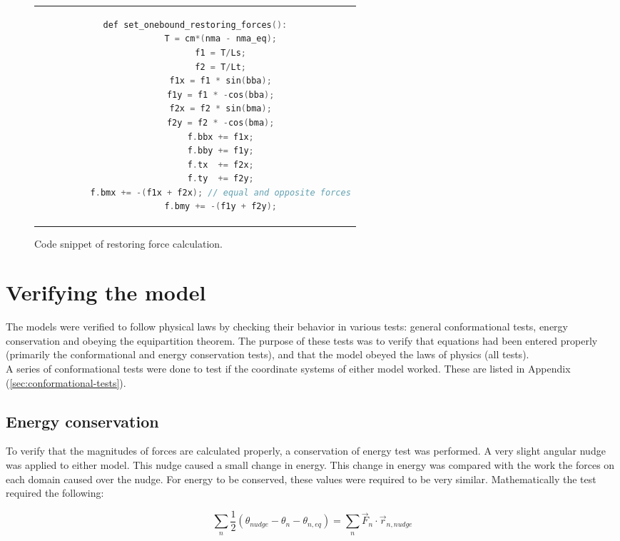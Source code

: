 \documentclass[
11pt, %
english, %
singlespacing, %
headsepline, %
chapterinoneline, %
]{MastersDoctoralThesis} %
\begin{document}
\begin{figure}[h]
  \centering
  \begin{tabular}{c}
    \begin{lstlisting}[language=C++]
      def set_onebound_restoring_forces():
          T = cm*(nma - nma_eq);
          f1 = T/Ls;
          f2 = T/Lt;
          f1x = f1 * sin(bba);
          f1y = f1 * -cos(bba);
          f2x = f2 * sin(bma);
          f2y = f2 * -cos(bma);
          f.bbx += f1x;
          f.bby += f1y;
          f.tx  += f2x;
          f.ty  += f2y;
          f.bmx += -(f1x + f2x); // equal and opposite forces
          f.bmy += -(f1y + f2y);
    \end{lstlisting}
  \end{tabular}
  \caption{Code snippet of restoring force calculation.}{}
  \label{snip:transition-rate-snippet}
\end{figure}

\section{Verifying the model}
The models were verified to follow physical laws by checking their behavior in various tests: general conformational tests, energy conservation and obeying the equipartition theorem. The purpose of these tests was to verify that equations had been entered properly (primarily the conformational and energy conservation tests), and that the model obeyed the laws of physics (all tests).\\

A series of conformational tests were done to test if the coordinate systems of either model worked. These are listed in Appendix (\ref{sec:conformational-tests}).\\

\subsection{Energy conservation}
\label{sec:energy-conservation}
To verify that the magnitudes of forces are calculated properly, a conservation of energy test was performed. A very slight angular nudge was applied to either model. This nudge caused a small change in energy. This change in energy was compared with the work the forces on each domain caused over the nudge. For energy to be conserved, these values were required to be very similar. Mathematically the test required the following:

\begin{equation}
  \sum_n \frac12 \left(\theta_{nudge} - \theta_{n} - \theta_{n,eq}\right) = \sum_n \vec{F}_n \cdot \vec{r}_{n,nudge}
\end{equation}
\end{document}
